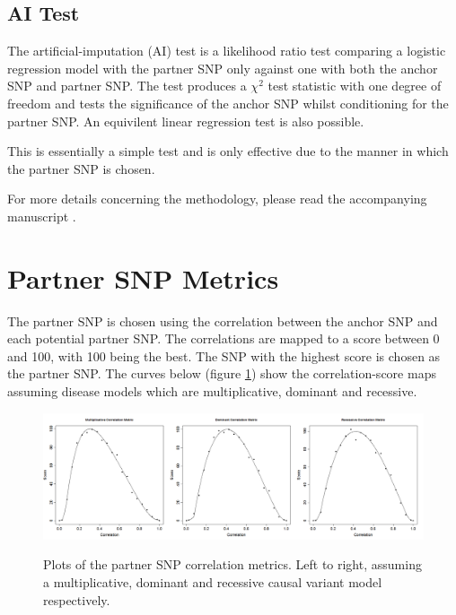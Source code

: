 \documentclass[a4paper,12pt]{article}
\begin{document}
\subsection{AI Test}
\label{ai-test}

The artificial-imputation (AI) test is a likelihood ratio test comparing a logistic regression model with the partner SNP only against one with both the anchor SNP and partner SNP. The test produces a $\chi^2$ test statistic with one degree of freedom and tests the significance of the anchor SNP whilst conditioning for the partner SNP. An equivilent linear regression test is also possible. 

This is essentially a simple test and is only effective due to the manner in which the partner SNP is chosen. 

For more details concerning the methodology, please read the accompanying manuscript \citet{howey:etal:14}. 




\section{Partner SNP Metrics}
\label{metrics}

The partner SNP is chosen using the correlation between the anchor SNP and each potential partner SNP. The correlations are mapped to a score between 0 and 100, with 100 being the best. The SNP with the highest score is chosen as the partner SNP. The curves below (figure  \ref{metric-fig}) show the correlation-score maps assuming disease models which are multiplicative, dominant and recessive. 
{\begin{figure}[ht]
{\begin{center}
{\includegraphics[width=400pt]{metrics.png}}
\caption{Plots of the partner SNP correlation metrics. Left to right, assuming a multiplicative, dominant and recessive causal variant model respectively.}
\label{metric-fig}
\end{center}}
\end{figure}
}
\end{document}
